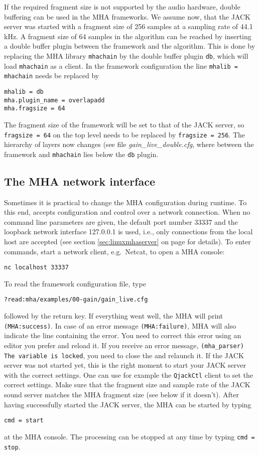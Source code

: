 If the required fragment size is not supported by the audio hardware,
double buffering can be used in the MHA frameworks. We assume now,
that the JACK server was started with a fragment size of 256 samples at
a sampling rate of 44.1 kHz. A fragment size of 64 samples in the algorithm 
can be reached by inserting a double buffer plugin between the framework and the algorithm. This is
done by replacing the MHA library \verb!mhachain! by the double
buffer plugin \verb!db!, which will load \verb!mhachain! as a
client. In the framework configuration the line \verb!mhalib = mhachain! needs
be replaced by
\begin{verbatim}
mhalib = db
mha.plugin_name = overlapadd
mha.fragsize = 64
\end{verbatim}
The fragment size of the framework will be set to that of the JACK
server, so \verb!fragsize = 64! on the top level needs to be replaced by
\verb!fragsize = 256!. The hierarchy of layers now changes (see 
file \emph{gain\_live\_double.cfg}, where between the framework
and \verb!mhachain! lies below the \verb!db! plugin.


\subsection{The MHA network interface}%
\label{sec:example_network}%
%
%
Sometimes it is practical to change the MHA configuration during runtime. To
this end, \mha{} accepts configuration and control over a network connection.
%
When no command line parameters are given, the default port number
33337 and the loopback network interface 127.0.0.1 is used, i.e., only
connections from the local host are accepted (see section
\ref{sec:linuxmhaserver} on page \pageref{sec:linuxmhaserver} for
details).
%
To enter \mha{} commands, start a network client, e.g.\ Netcat, to
open a MHA console:
\begin{verbatim}nc localhost 33337\end{verbatim}

To read the framework configuration file, type
\begin{verbatim}
?read:mha/examples/00-gain/gain_live.cfg
\end{verbatim}
followed by the return key. If everything went well, the MHA will print
\verb!(MHA:success)!. In case of an error message \verb!(MHA:failure)!, MHA 
will also indicate the line containing the error. You need to correct this 
error using an editor you prefer and  reload it. If you receive an error 
message, \verb!(mha_parser) The variable is locked!, you need to close the 
\mhad{} and relaunch it. If the JACK server was not started yet, this is the
right moment to start your JACK server with the correct settings. One can use 
for example the \verb!QjackCtl! client to set the correct settings.
Make sure that the fragment size and sample rate of the JACK
sound server matches the MHA fragment size (see below if it
doesn't). After having successfully started the JACK server, the MHA
can be started by typing
\begin{verbatim}
cmd = start
\end{verbatim}
at the MHA console. The processing can be stopped at any time by
typing \verb!cmd = stop!.

